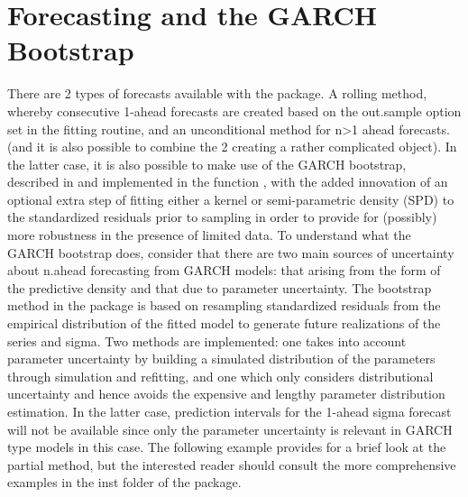 \section{Forecasting and the GARCH Bootstrap}\label{section:forecasting}
There are 2 types of forecasts available with the package. A rolling method,
whereby consecutive 1-ahead forecasts are created based on the out.sample option
set in the fitting routine, and an unconditional method for n>1 ahead forecasts.
(and it is also possible to combine the 2 creating a rather complicated object). 
In the latter case, it is also possible to make use of the GARCH bootstrap, 
described in \cite{Pascual2006} and implemented in the function \verb@ugarchboot@, 
with the added innovation of an optional extra  step of fitting either a kernel 
or semi-parametric density (SPD) to the standardized residuals prior to sampling 
in order to provide for (possibly) more robustness  in the presence of limited data.
To understand what the GARCH bootstrap does, consider that there are two main 
sources of uncertainty about n.ahead forecasting from GARCH models: that arising 
from the form of the predictive density and that due to parameter uncertainty. 
The bootstrap method in the \verb@rugarch@ package is based on
resampling standardized residuals from the empirical distribution of the fitted model
to generate future realizations of the series and sigma. Two methods are implemented:
one takes into account parameter uncertainty by building a simulated distribution
of the parameters through simulation and refitting, and one which only considers
distributional uncertainty and hence avoids the expensive and lengthy parameter
distribution estimation. In the latter case, prediction intervals for the 1-ahead sigma
forecast will not be available since only the parameter uncertainty is relevant in
GARCH type models in this case. The following example provides for a brief look at the
partial method, but the interested reader should consult the more comprehensive examples 
in the inst folder of the package.
